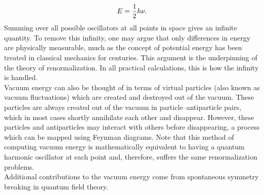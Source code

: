 \begin{equation}
E=\frac{1}{2} h \nu.
\end{equation}
Summing over all possible oscillators at all points in space gives an infinite quantity. To remove this infinity, one may argue that only differences in energy are physically measurable, much as the concept of potential energy has been treated in classical mechanics for centuries. This argument is the underpinning of the theory of renormalization. In all practical calculations, this is how the infinity is handled.\\
Vacuum energy can also be thought of in terms of virtual particles (also known as vacuum fluctuations) which are created and destroyed out of the vacuum. These particles are always created out of the vacuum in particle–antiparticle pairs, which in most cases shortly annihilate each other and disappear. However, these particles and antiparticles may interact with others before disappearing, a process which can be mapped using Feynman diagrams. Note that this method of computing vacuum energy is mathematically equivalent to having a quantum harmonic oscillator at each point and, therefore, suffers the same renormalization problems.\\
Additional contributions to the vacuum energy come from spontaneous symmetry breaking in quantum field theory.
